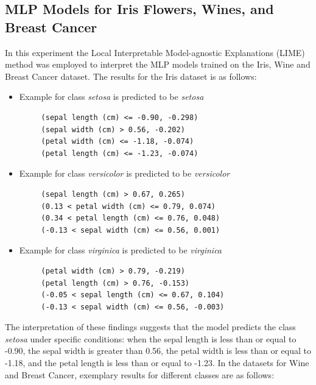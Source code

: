 \documentclass[journal, a4paper]{IEEEtran}
\begin{document}
\subsection{MLP Models for Iris Flowers, Wines, and Breast Cancer}\label{subsec:experiment-other-datasets}
In this experiment the Local Interpretable Model-agnostic Explanations (LIME) method was employed to interpret the MLP models trained on the Iris, Wine and Breast Cancer dataset.
The results for the Iris dataset is as follows:
\begin{itemize}
    \item Example for class \textit{setosa} is predicted to be \textit{setosa} \\
    {\tiny
    \begin{verbatim}
     (sepal length (cm) <= -0.90, -0.298)
     (sepal width (cm) > 0.56, -0.202)
     (petal width (cm) <= -1.18, -0.074)
     (petal length (cm) <= -1.23, -0.074)
    \end{verbatim}
    }

    \item Example for class \textit{versicolor} is predicted to be \textit{versicolor} \\
    {\tiny
    \begin{verbatim}
     (sepal length (cm) > 0.67, 0.265)
     (0.13 < petal width (cm) <= 0.79, 0.074)
     (0.34 < petal length (cm) <= 0.76, 0.048)
     (-0.13 < sepal width (cm) <= 0.56, 0.001)
    \end{verbatim}
    }

    \item Example for class \textit{virginica} is predicted to be \textit{virginica} \\
    {\tiny
    \begin{verbatim}
     (petal width (cm) > 0.79, -0.219)
     (petal length (cm) > 0.76, -0.153)
     (-0.05 < sepal length (cm) <= 0.67, 0.104)
     (-0.13 < sepal width (cm) <= 0.56, -0.003)
    \end{verbatim}
    }
\end{itemize}

The interpretation of these findings suggests that the model predicts the class \textit{setosa} under specific conditions: when the sepal length is less than or equal to -0.90, the sepal width is greater than 0.56, the petal width is less than or equal to -1.18, and the petal length is less than or equal to -1.23.
In the datasets for Wine and Breast Cancer, exemplary results for different classes are as follows:
\end{document}
